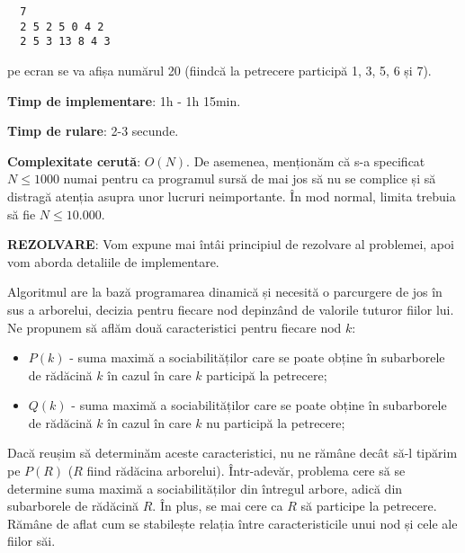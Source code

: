 \begin{verbatim}
  7
  2 5 2 5 0 4 2
  2 5 3 13 8 4 3
\end{verbatim}

pe ecran se va afișa numărul 20 (fiindcă la petrecere participă 1, 3, 5, 6 și
7).

{\bf Timp de implementare}: 1h - 1h 15min.

{\bf Timp de rulare}: 2-3 secunde.

{\bf Complexitate cerută}: $O(N)$. De asemenea, menționăm că s-a specificat $N
\leq 1000$ numai pentru ca programul sursă de mai jos să nu se complice și să
distragă atenția asupra unor lucruri neimportante. În mod normal, limita
trebuia să fie $N \leq 10.000$.

{\bf REZOLVARE}: Vom expune mai întâi principiul de rezolvare al problemei,
apoi vom aborda detaliile de implementare.

Algoritmul are la bază programarea dinamică și necesită o parcurgere de jos în
sus a arborelui, decizia pentru fiecare nod depinzând de valorile tuturor
fiilor lui. Ne propunem să aflăm două caracteristici pentru fiecare nod $k$:

\begin{itemize}

\item $P(k)$ - suma maximă a sociabilităților care se poate obține în
  subarborele de rădăcină $k$ în cazul în care $k$ participă la petrecere;

\item $Q(k)$ - suma maximă a sociabilităților care se poate obține în
  subarborele de rădăcină $k$ în cazul în care $k$ nu participă la petrecere;

\end{itemize}

Dacă reușim să determinăm aceste caracteristici, nu ne rămâne decât să-l
tipărim pe $P(R)$ ($R$ fiind rădăcina arborelui). Într-adevăr, problema cere
să se determine suma maximă a sociabilităților din întregul arbore, adică din
subarborele de rădăcină $R$. În plus, se mai cere ca $R$ să participe la
petrecere. Rămâne de aflat cum se stabilește relația între caracteristicile
unui nod și cele ale fiilor săi.


